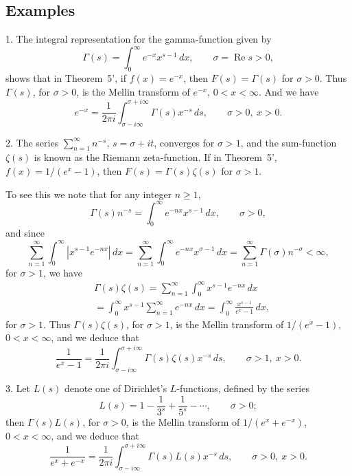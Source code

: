 \subsection*{Examples}
1. The integral representation for the gamma-function given by
\begin{equation*}
\Gamma(s)=\int_0^\infty e^{-x}x^{s-1}\,dx,\qquad \sigma=\operatorname{Re}s>0,
\end{equation*}
shows that in Theorem~5', if $f(x)=e^{-x}$, then $F(s)=\Gamma(s)$ for $\sigma>0$. Thus $\Gamma(s)$, for $\sigma>0$, is the Mellin transform of $e^{-x}$, $0<x<\infty$. And we have
\begin{equation*}
e^{-x}=\frac{1}{2\pi i}\int_{\sigma-i\infty}^{\sigma+i\infty}\Gamma(s)x^{-s}\,ds,
\qquad\sigma>0,\ x>0.
\end{equation*}

2. The series $\sum_{n=1}^\infty n^{-s}$, $s=\sigma+it$, converges for $\sigma>1$, and the sum-function $\zeta(s)$ is known as the Riemann zeta-function. If in Theorem~5', $f(x)=1/(e^x-1)$, then $F(s)=\Gamma(s)\zeta(s)$ for $\sigma>1$.

To see this we note that for any integer $n\ge 1$,
\begin{equation*}
\Gamma(s)n^{-s}=\int_0^\infty e^{-nx}x^{s-1}\,dx,\qquad\sigma>0,
\end{equation*}
and since
\begin{equation*}
\sum_{n=1}^\infty\int_0^\infty|x^{s-1}e^{-nx}|\,dx
=\sum_{n=1}^\infty\int_0^\infty e^{-nx}x^{\sigma-1}\,dx
=\sum_{n=1}^\infty\Gamma(\sigma)n^{-\sigma}<\infty,
\end{equation*}
for $\sigma>1$, we have
\begin{equation*}
\begin{aligned}
&\Gamma(s)\zeta(s) = \sum_{n=1}^\infty  \int_0^\infty x^{s-1}e^{-nx}\,dx\\
&= \int_0^\infty x^{s-1}\sum_{n=1}^\infty e^{-nx}\,dx = \int_0^\infty\frac{x^{s-1}}{e^x-1}\,dx,
\end{aligned}
\end{equation*}
for $\sigma>1$. Thus $\Gamma(s)\zeta(s)$, for $\sigma>1$, is the Mellin transform of $1/(e^x-1)$, $0<x<\infty$, and we deduce that
\begin{equation*}
\frac{1}{e^x-1}=\frac{1}{2\pi i}\int_{\sigma-i\infty}^{\sigma+i\infty}\Gamma(s)\zeta(s)x^{-s}\,ds,
\qquad\sigma>1,\ x>0.
\end{equation*}

3. Let $L(s)$ denote one of Dirichlet's $L$-functions, defined by the series
\begin{equation*}
L(s)=1-\frac{1}{3^s}+\frac{1}{5^s}-\cdots,\qquad\sigma>0;
\end{equation*}
then $\Gamma(s)L(s)$, for $\sigma>0$, is the Mellin transform of $1/(e^x+e^{-x})$, $0<x<\infty$, and we deduce that
\begin{equation*}
\frac{1}{e^x+e^{-x}}=\frac{1}{2\pi i}\int_{\sigma-i\infty}^{\sigma+i\infty}\Gamma(s)L(s)x^{-s}\,ds,
\qquad\sigma>0,\ x>0.
\end{equation*}

